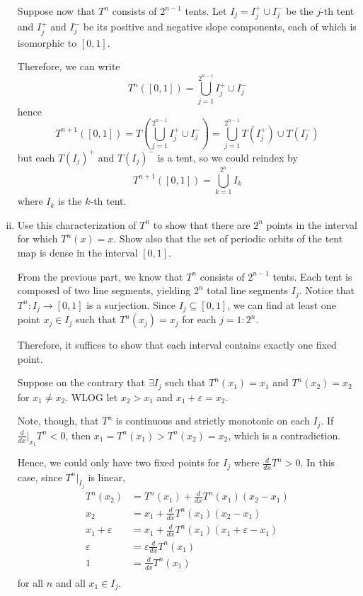 \documentclass[12pt]{article}
\newcommand{\ep}{\varepsilon}
\newcommand{\sub}{\subseteq}
\begin{document}
\begin{enumerate}[(i)]
          Suppose now that $T^n$ consists of $2^{n-1}$ tents. Let $I_j = I_j^+ \cup I_j^-$ be the $j$-th tent and $I_j^+$ and $I_j^-$ be its positive and negative slope components, each of which is isomorphic to $[0, 1]$.

          Therefore, we can write
          \[T^n([0, 1]) = \bigcup_{j=1}^{2^{n-1}} I_j^+ \cup I_j^-\]
          hence
          \[T^{n+1}([0, 1]) = T\left(\bigcup_{j=1}^{2^{n-1}} I_j^+ \cup I_j^-\right) = \bigcup_{j=1}^{2^{n-1}} T(I_j^+) \cup T(I_j^-)\]
          but each $T(I_j)^+$ and $T(I_j)^-$ is a tent, so we could reindex by
          \[T^{n+1}([0, 1]) = \bigcup_{k=1}^{2^{n}} I_k\]
          where $I_k$ is the $k$-th tent.
          \color{black}

    \item Use this characterization of $T^n$ to show that there are $2^n$ points in the interval for which $T^n(x)=x$. Show also that the set of periodic orbits of the tent map is dense in the interval $[0,1]$.

          \color{blue}
          From the previous part, we know that $T^n$ consists of $2^{n-1}$ tents. Each tent is composed of two line segments, yielding $2^n$ total line segments $I_j$. Notice that $T^n: I_j \to [0, 1]$ is a surjection. Since $I_j \sub [0, 1]$, we can find at least one point $x_j \in I_j$ such that $T^n (x_j) = x_j$ for each $j=1: 2^n$.

          Therefore, it suffices to show that each interval contains exactly one fixed point.

          Suppose on the contrary that $\exists I_j$ such that $T^n(x_1) = x_1$ and $T^n(x_2) = x_2$ for $x_1 \neq x_2$. WLOG let $x_2 > x_1$ and $x_1 + \ep = x_2$.

          Note, though, that $T^n$ is continuous and strictly monotonic on each $I_j$. If $\frac{d}{dx}\big\vert_{x_1} T^n < 0$, then $x_1 = T^n(x_1) > T^n(x_2) = x_2$, which is a contradiction.

          Hence, we could only have two fixed points for $I_j$ where $\frac{d}{dx}T^n > 0$. In this case, since $T^n \big\vert_{I_j}$ is linear,
          \begin{align*}
              T^n(x_2)  & = T^n(x_1) + \frac{d}{dx}T^n(x_1)(x_2 - x_1)   \\
              x_2       & = x_1 + \frac{d}{dx}T^n(x_1)(x_2 - x_1)        \\
              x_1 + \ep & = x_1 + \frac{d}{dx}T^n(x_1) (x_1 + \ep - x_1) \\
              \ep       & = \ep \frac{d}{dx}T^n(x_1)                     \\
              1         & = \frac{d}{dx}T^n(x_1)                         \\
          \end{align*}
          for all $n$ and all $x_1 \in I_j$.


\end{enumerate}
\end{document}
